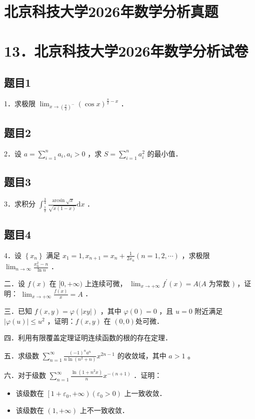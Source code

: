 \documentclass{article}
\begin{document}
\section*{北京科技大学2026年数学分析真题}
\section*{13．北京科技大学2026年数学分析试卷}

\subsection{题目1}
1．求极限 \(\lim _{x \rightarrow\left(\frac{\pi}{2}\right)^{-}}(\cos x)^{\frac{\pi}{2}-x}\) ．

\subsection{题目2}
2．设 \(a=\sum_{i=1}^{n} a_{i}, a_{i}>0\) ，求 \(S=\sum_{i=1}^{n} a_{i}^{2}\) 的最小值．

\subsection{题目3}
3．求积分 \(\int_{\frac{1}{2}}^{\frac{3}{4}} \frac{\arcsin \sqrt{x}}{\sqrt{x(1-x)}} \mathrm{d} x\) ．

\subsection{题目4}
4．设 \(\left\{x_{n}\right\}\) 满足 \(x_{1}=1, x_{n+1}=x_{n}+\frac{1}{2 x_{n}}(n=1,2, \cdots)\) ，求极限 \(\lim _{n \rightarrow \infty} \frac{x_{n}^{2}-n}{\ln n}\) ．

二．设 \(f(x)\) 在 \([0,+\infty)\) 上连续可微， \(\lim _{x \rightarrow+\infty} f^{\prime}(x)=A(A\) 为常数 \()\) ，证明： \(\lim _{x \rightarrow+\infty} \frac{f(x)}{x}=A\) ．

三．已知 \(f(x, y)=\varphi(|x y|)\) ，其中 \(\varphi(0)=0\) ，且 \(u=0\) 附近满足 \(|\varphi(u)| \leq u^{2}\) ，证明：\(f(x, y)\) 在 \((0,0)\)处可微．

四．利用有限覆盖定理证明连续函数的根的存在定理．

五．求级数 \(\sum_{n=1}^{\infty} \frac{(-1)^{n} a^{n}}{n \ln \left(n^{2}+n\right)} x^{2 n-1}\) 的收敛域，其中 \(a>1\) 。

六．对于级数 \(\sum_{n=1}^{\infty} \frac{\ln \left(1+n^{2} x\right)}{n} x^{-(n+1)}\) ．证明：

\begin{itemize}
  \item[（1）] 该级数在 \(\left[1+\varepsilon_{0},+\infty\right)\left(\varepsilon_{0}>0\right)\) 上一致收敛．
  \item[（2）] 该级数在 \((1,+\infty)\) 上不一致收敛．
\end{itemize}
\end{document}

